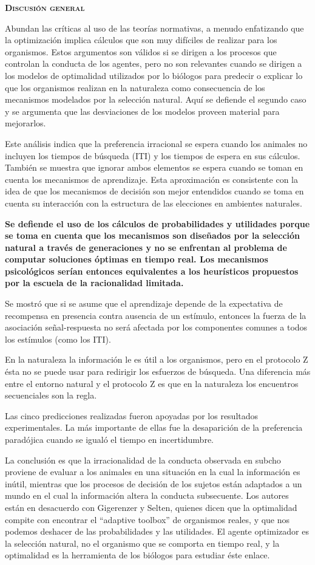 \documentclass[a4paper,12pt]{article}
\begin{document}
{\scshape\bfseries Discusión general}

Abundan las críticas al uso de las teorías normativas, a menudo enfatizando que la optimización implica cálculos que son muy difíciles de realizar para los organismos. Estos argumentos son válidos si se dirigen a los procesos que controlan la conducta de los agentes, pero no son relevantes cuando se dirigen a los modelos de optimalidad utilizados por lo biólogos para predecir o explicar lo que los organismos realizan en la naturaleza como consecuencia de los mecanismos modelados por la selección natural. Aquí se defiende el segundo caso y se argumenta que las desviaciones de los modelos proveen material para mejorarlos.

Este análisis indica que la preferencia irracional se espera cuando los animales no incluyen los tiempos de búsqueda (ITI) y los tiempos de espera en sus cálculos. También se muestra que ignorar ambos elementos se espera cuando se toman en cuenta los mecanismos de aprendizaje. Esta aproximación es consistente con la idea de que los mecanismos de decisión son mejor entendidos cuando se toma en cuenta su interacción con la estructura de las elecciones en ambientes naturales.

{\bfseries Se defiende el uso de los cálculos de probabilidades y utilidades porque se toma en cuenta que los mecanismos son diseñados por la selección natural a través de generaciones y no se enfrentan al problema de computar soluciones óptimas en tiempo real. Los mecanismos psicológicos serían entonces equivalentes a los heurísticos propuestos por la escuela de la racionalidad limitada.}

Se mostró que si se asume que el aprendizaje depende de la expectativa de recompensa en presencia contra ausencia de un estímulo, entonces la fuerza de la asociación señal-respuesta no será afectada por los componentes comunes a todos los estímulos (como los ITI). 

En la naturaleza la información le es útil a los organismos, pero en el protocolo Z ésta no se puede usar para redirigir los esfuerzos de búsqueda. Una diferencia más entre el entorno natural y el protocolo Z es que en la naturaleza los encuentros secuenciales son la regla. 

Las cinco predicciones realizadas fueron apoyadas por los resultados experimentales. La más importante de ellas fue la desaparición de la preferencia paradójica cuando se igualó el tiempo en incertidumbre.

La conclusión es que la irracionalidad de la conducta observada en subcho proviene de evaluar a los animales en una situación en la cual la información es inútil, mientras que los procesos de decisión de los sujetos están adaptados a un mundo en el cual la información altera la conducta subsecuente. Los autores están en desacuerdo con Gigerenzer y Selten, quienes dicen que la optimalidad compite con encontrar el ``adaptive toolbox'' de organismos reales, y que nos podemos deshacer de las probabilidades y las utilidades. El agente optimizador es la selección natural, no el organismo que se comporta en tiempo real, y la optimalidad es la herramienta de los biólogos para estudiar éste enlace.
\end{document}
